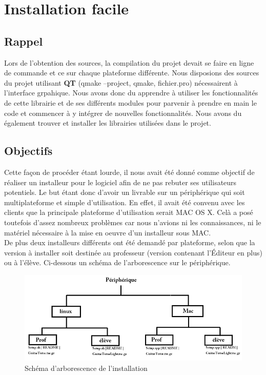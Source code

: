 \chapter{Installation facile}
\section{Rappel}
Lors de l'obtention des sources, la compilation du projet devait se faire en ligne de commande
et ce sur chaque plateforme différente. Nous disposions des sources du projet utilisant 
\textbf{QT} (qmake --project, qmake, fichier.pro) nécessairent à l'interface grpahique. Nous avons donc du apprendre à utiliser 
les fonctionnalités de cette librairie et de ses différents modules pour parvenir à prendre en main le code et commencer à y
intégrer de nouvelles fonctionnalités. Nous avons du également trouver et installer les librairies utilisées dans le projet.

\section{Objectifs}
Cette façon de procéder étant lourde, il nous avait été donné comme objectif de réaliser
un installeur pour le logiciel afin de ne pas rebuter ses utilisateurs potentiels. Le but étant donc
d'avoir un livrable sur un périphérique qui soit multiplateforme et simple d'utilisation.
En effet, il avait été convenu avec les clients que la principale plateforme d'utilisation serait
MAC OS X. Celà a posé toutefois d'assez nombreux problèmes car nous n'avions ni les connaissances,
ni le matériel nécessaire à la mise en oeuvre d'un installeur sous MAC.
\\
De plus deux installeurs différents ont été demandé par plateforme, selon que la version à installer
soit destinée au professeur (version contenant l'Éditeur en plus) ou à l'élève. Ci-dessous un schéma
de l'arborescence sur le périphérique.

\begin{figure}[!h]
\begin{center}
\includegraphics[scale=0.6]{arborescence_installation.png}
\end{center}
\caption{Schéma d'arborescence de l'installation}
\end{figure}

